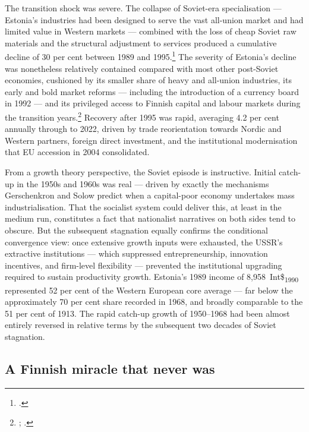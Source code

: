 \documentclass[12pt,a4paper]{article}
\newcommand{\intlnineteen}{Int\$\textsubscript{1990}}   %
\begin{document}
The transition shock was severe. The collapse of Soviet-era specialisation — Estonia's industries had been designed to serve the vast all-union market and had limited value in Western markets — combined with the loss of cheap Soviet raw materials and the structural adjustment to services produced a cumulative decline of 30 per cent between 1989 and 1995.\footnote{\autocite[164--166]{norkus_restorations}.} The severity of Estonia's decline was nonetheless relatively contained compared with most other post-Soviet economies, cushioned by its smaller share of heavy and all-union industries, its early and bold market reforms — including the introduction of a currency board in 1992 — and its privileged access to Finnish capital and labour markets during the transition years.\footnote{\autocite[22]{transition_greenes}; \autocite[11, 176]{norkus_restorations}.} Recovery after 1995 was rapid, averaging 4.2 per cent annually through to 2022, driven by trade reorientation towards Nordic and Western partners, foreign direct investment, and the institutional modernisation that EU accession in 2004 consolidated.

From a growth theory perspective, the Soviet episode is instructive. Initial catch-up in the 1950s and 1960s was real — driven by exactly the mechanisms Gerschenkron and Solow predict when a capital-poor economy undertakes mass industrialisation. That the socialist system could deliver this, at least in the medium run, constitutes a fact that nationalist narratives on both sides tend to obscure. But the subsequent stagnation equally confirms the conditional convergence view: once extensive growth inputs were exhausted, the USSR's extractive institutions — which suppressed entrepreneurship, innovation incentives, and firm-level flexibility — prevented the institutional upgrading required to sustain productivity growth. Estonia's 1989 income of 8,958~\intlnineteen{} represented 52 per cent of the Western European core average — far below the approximately 70 per cent share recorded in 1968, and broadly comparable to the 51 per cent of 1913. The rapid catch-up growth of 1950--1968 had been almost entirely reversed in relative terms by the subsequent two decades of Soviet stagnation.

\subsection{A Finnish miracle that never was}
\label{subsec:finland}

%
\end{document}
